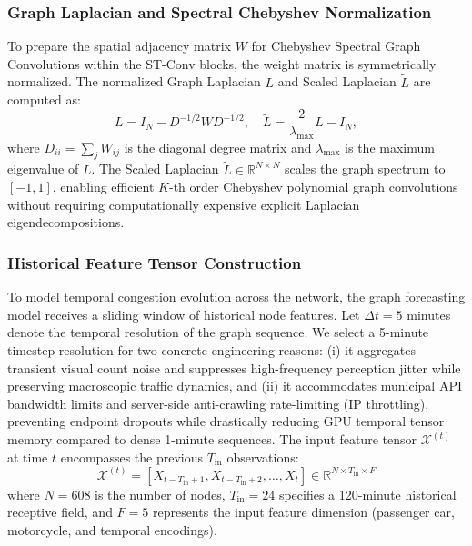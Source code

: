 \documentclass[a4paper,fleqn]{cas-sc}
\begin{document}
\subsubsection{Graph Laplacian and Spectral Chebyshev Normalization}
To prepare the spatial adjacency matrix $W$ for Chebyshev Spectral Graph Convolutions within the ST-Conv blocks, the weight matrix is symmetrically normalized. The normalized Graph Laplacian $L$ and Scaled Laplacian $\tilde{L}$ are computed as:
\begin{equation}
L = I_N - D^{-1/2} W D^{-1/2}, \quad \tilde{L} = \frac{2}{\lambda_{\max}} L - I_N,
\end{equation}
where $D_{ii} = \sum_{j} W_{ij}$ is the diagonal degree matrix and $\lambda_{\max}$ is the maximum eigenvalue of $L$. The Scaled Laplacian $\tilde{L} \in \mathbb{R}^{N \times N}$ scales the graph spectrum to $[-1, 1]$, enabling efficient $K$-th order Chebyshev polynomial graph convolutions without requiring computationally expensive explicit Laplacian eigendecompositions.

\subsubsection{Historical Feature Tensor Construction}
To model temporal congestion evolution across the network, the graph forecasting model receives a sliding window of historical node features. Let $\Delta t = 5$ minutes denote the temporal resolution of the graph sequence. We select a 5-minute timestep resolution for two concrete engineering reasons: (i) it aggregates transient visual count noise and suppresses high-frequency perception jitter while preserving macroscopic traffic dynamics, and (ii) it accommodates municipal API bandwidth limits and server-side anti-crawling rate-limiting (IP throttling), preventing endpoint dropouts while drastically reducing GPU temporal tensor memory compared to dense 1-minute sequences. The input feature tensor $\mathcal{X}^{(t)}$ at time $t$ encompasses the previous $T_{\text{in}}$ observations:
\begin{equation}
\mathcal{X}^{(t)} = \left[ X_{t-T_{\text{in}}+1}, X_{t-T_{\text{in}}+2}, \dots, X_t \right] \in \mathbb{R}^{N \times T_{\text{in}} \times F}
\end{equation}
where $N = 608$ is the number of nodes, $T_{\text{in}} = 24$ specifies a 120-minute historical receptive field, and $F = 5$ represents the input feature dimension (passenger car, motorcycle, and temporal encodings). 
\end{document}
